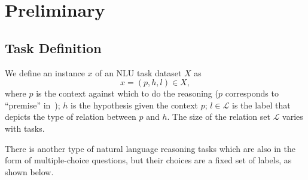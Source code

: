 \section{Preliminary}
\label{sec:formulation}
\subsection{Task Definition}
We define an instance $x$ of an NLU task 
dataset $X$ as
\begin{equation}
    x = (p, h, l) \in X, \label{eq:nli}
\end{equation}
\noindent
where $p$ is the context against which to do the reasoning ($p$ corresponds 
to ``premise'' in~);
$h$ is the hypothesis given the context $p$; 
$l \in \mathcal{L}$ is the label that 
depicts the type of relation between $p$ and $h$. 
The size of the relation set $\mathcal{L}$ varies with tasks. 



There is another type of natural language reasoning tasks which 
are also in the form of multiple-choice questions, 
but their choices are a fixed set of labels, as shown below. 

